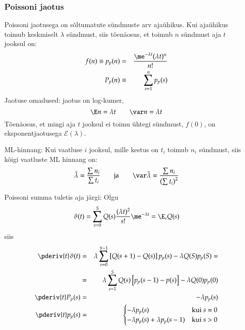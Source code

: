 \documentclass[a4paper]{article}
\numberwithin{equation}{subsection}
\begin{document}
\subsubsection{Poissoni jaotus}
Poissoni jaotusega on sõltumatute sündmuste arv ajaühikus.  Kui
ajaühikus toimub keskmiselt $\lambda$ sündmust, siis tõenäosus, et
toimub $n$ sündmust aja $t$ jooksul on:
\begin{eqnarray}
f(n)\equiv p_p(n) &=& \frac{\me^{-\lambda t}(\lambda t)^n}{n!}\\
P_p(n) &\equiv& \sum_{s=1}^n p_p(s)
\end{eqnarray}
Jaotuse omadused: jaotus on log-kumer,
\begin{equation}
  \E n = \lambda t \qquad \var n = \lambda t
\end{equation}
Tõenäosus, et mingi aja $t$ jooksul ei toimu ühtegi sündmust, $f(0)$, on
eksponentjaotusega $\mathcal{E}(\lambda)$.

ML-hinnang: Kui vaatluse $i$ jooksul, mille kestus on $t_i$ 
toimub $n_i$ sündmust, siis kõigi vaatluste ML hinnang on:
\begin{equation}
  \hat\lambda = \frac{\sum n_i}{\sum t_i} 
  \qquad \mbox{ja} \qquad
  \var\hat\lambda = \frac{\sum n_i}{\left( \sum t_i \right)^2}
\end{equation}

Poissoni summa tuletis aja järgi: Olgu
\begin{equation}
  \vartheta(t) =
  \sum_{s=0}^S Q(s) \frac{(\lambda t)^2}{s!} \me^{-\lambda t} = 
  \E_s Q(s)
\end{equation}
siis
\begin{eqnarray}
  \pderiv{t} \vartheta(t) &=&
  \lambda \sum_{s=0}^{S - 1}
  \left[ Q(s + 1) - Q(s) \right] p_p(s) -
  \lambda Q(S) p_p(S) =\\
  &=&
  \lambda \sum_{s=1}^S Q(s) 
  \left[ p_p(s - 1) - p(s) \right]
  - \lambda Q(0) p_p(0)\\
  \pderiv{t} P_p(s) &=& -\lambda p_p(s)\\
  \pderiv{t} p_p(s) &=&
  \begin{cases}
    -\lambda p_p(s) & \text{kui $s$ = 0}\\
    -\lambda p_p(s) + \lambda p_p(s-1) & \text{kui $s$ > 0}\\
  \end{cases}
\end{eqnarray}
\end{document}
